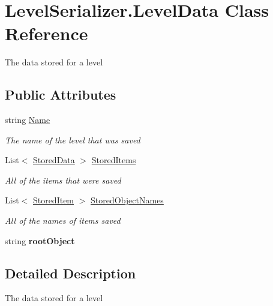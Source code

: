 \hypertarget{class_level_serializer_1_1_level_data}{}\section{Level\+Serializer.\+Level\+Data Class Reference}
\label{class_level_serializer_1_1_level_data}


The data stored for a level  


\subsection*{Public Attributes}
\begin{DoxyCompactItemize}
\item 
string \hyperlink{class_level_serializer_1_1_level_data_a48a7e96d392fff3d3060654c329c4cda}{Name}
\begin{DoxyCompactList}\small\item\em The name of the level that was saved \end{DoxyCompactList}\item 
List$<$ \hyperlink{class_level_serializer_1_1_stored_data}{Stored\+Data} $>$ \hyperlink{class_level_serializer_1_1_level_data_abcbeea8b0c4fa1b1d58ef82c3440e18d}{Stored\+Items}
\begin{DoxyCompactList}\small\item\em All of the items that were saved \end{DoxyCompactList}\item 
List$<$ \hyperlink{class_level_serializer_1_1_stored_item}{Stored\+Item} $>$ \hyperlink{class_level_serializer_1_1_level_data_a9856376db0262a37e33f3c37ff90dcc9}{Stored\+Object\+Names}
\begin{DoxyCompactList}\small\item\em All of the names of items saved \end{DoxyCompactList}\item 
\mbox{\label{class_level_serializer_1_1_level_data_a0b96560392b6a45eb43952bfb7c09a83}} 
string {\bfseries root\+Object}
\end{DoxyCompactItemize}


\subsection{Detailed Description}
The data stored for a level 



